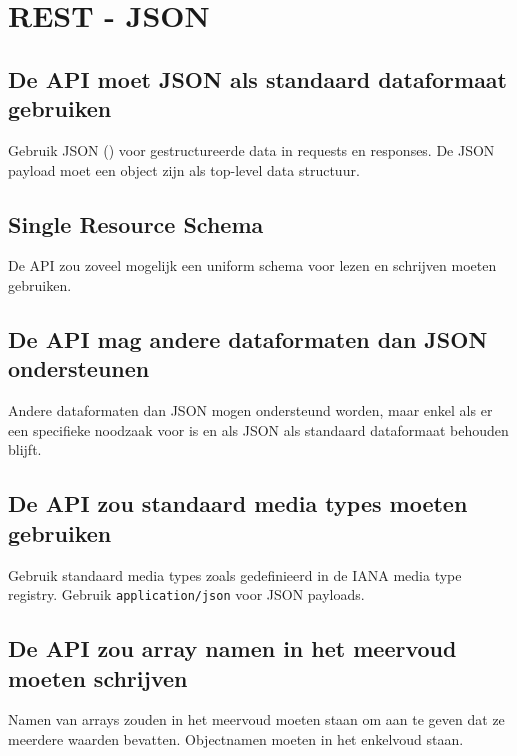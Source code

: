 \section{REST - JSON}

\subsection{De API moet JSON als standaard dataformaat gebruiken}
\label{subsection:json_standaard}

Gebruik JSON (\autocite{rfc7159}) voor gestructureerde data in requests en responses. De JSON payload moet een object zijn als top-level data structuur.

\subsection{Single Resource Schema}
\label{subsection:single_resource_schema}

De API zou zoveel mogelijk een uniform schema voor lezen en schrijven moeten gebruiken.

\subsection{De API mag andere dataformaten dan JSON ondersteunen}
\label{subsection:andere_dataformaten}

Andere dataformaten dan JSON mogen ondersteund worden, maar enkel als er een specifieke noodzaak voor is en als JSON als standaard dataformaat behouden blijft.

\subsection{De API zou standaard media types moeten gebruiken}
\label{subsection:standaard_media_types}

Gebruik standaard media types zoals gedefinieerd in de IANA media type registry. Gebruik \texttt{application/json} voor JSON payloads.

\subsection{De API zou array namen in het meervoud moeten schrijven}
\label{subsection:array_namen_meervoud}

Namen van arrays zouden in het meervoud moeten staan om aan te geven dat ze meerdere waarden bevatten. Objectnamen moeten in het enkelvoud staan.

